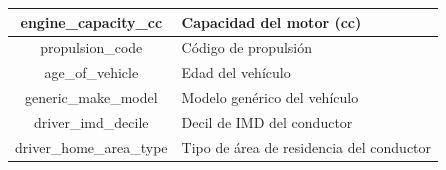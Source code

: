 \begin{table}[H]
\begin{center}
\begin{tabular}{|c|l|}
			engine\_capacity\_cc & Capacidad del motor (cc) \\ \hline
			propulsion\_code & Código de propulsión \\ \hline
			age\_of\_vehicle & Edad del vehículo \\ \hline
			generic\_make\_model & Modelo genérico del vehículo \\ \hline
			driver\_imd\_decile & Decil de IMD del conductor \\ \hline
			driver\_home\_area\_type & Tipo de área de residencia del conductor \\ \hline
		\end{tabular}
	\end{center}

	\label{UK_VEHICLE_TABLE}
\end{table}

